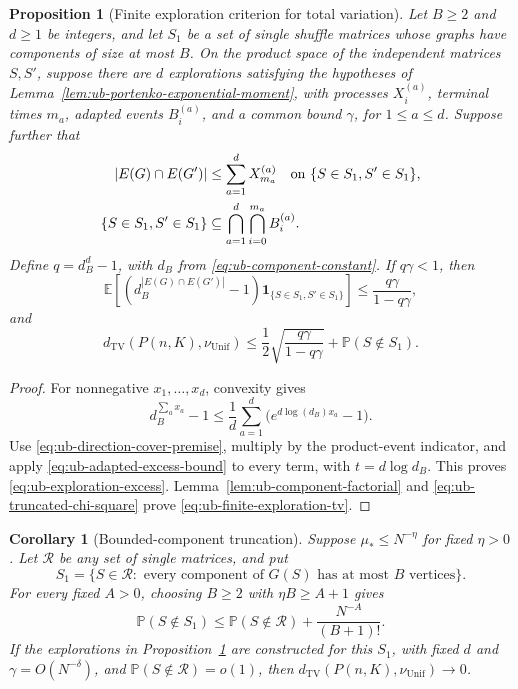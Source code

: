 \documentclass[11pt]{article}
\numberwithin{equation}{section}
\newtheorem{proposition}[proposition]{Proposition}
\newtheorem{corollary}[corollary]{Corollary}
\newcommand{\TV}{\mathrm{TV}}
\newcommand{\Unif}{\mathrm{Unif}}
\newcommand{\E}{\mathbb E}
\newcommand{\Pp}{\mathbb P}
\newcommand{\1}{\mathbf 1}
\newcommand{\dTV}{d_{\TV}}
\newcommand{\nuUnif}{\nu_{\Unif}}
\begin{document}
\begin{proposition}[Finite exploration criterion for total variation]
\label{lem:ub-shared-edge-exponential-moment}
Let $B\ge2$ and $d\ge1$ be integers, and let $S_1$ be a set of single
shuffle matrices whose graphs have components of size at most $B$.
On the product space of the independent matrices $S,S'$, suppose there
are $d$ explorations satisfying the hypotheses of
Lemma~\ref{lem:ub-portenko-exponential-moment}, with processes
$X^{(a)}_i$, terminal times $m_a$, adapted events $B^{(a)}_i$, and a
common bound $\gamma$, for $1\le a\le d$. Suppose further that
\begin{equation}
\label{eq:ub-direction-cover-premise}
 \begin{aligned}
 |E(G)\cap E(G')|&\le\sum_{a=1}^dX^{(a)}_{m_a}
 \quad\hbox{on }\{S\in S_1,S'\in S_1\},\\
 \{S\in S_1,S'\in S_1\}&\subseteq
                \bigcap_{a=1}^d\bigcap_{i=0}^{m_a}B^{(a)}_i.
 \end{aligned}
\end{equation}
Define $q=d_B^d-1$, with $d_B$ from
\eqref{eq:ub-component-constant}. If $q\gamma<1$, then
\begin{equation}
\label{eq:ub-exploration-excess}
 \E\left[(d_B^{|E(G)\cap E(G')|}-1)
       \1_{\{S\in S_1,S'\in S_1\}}\right]
 \le\frac{q\gamma}{1-q\gamma},
\end{equation}
and
\begin{equation}
\label{eq:ub-finite-exploration-tv}
 \dTV(P(n,K),\nuUnif)
 \le\frac12\sqrt{\frac{q\gamma}{1-q\gamma}}+\Pp(S\notin S_1).
\end{equation}
\end{proposition}

\begin{proof}
For nonnegative $x_1,\ldots,x_d$, convexity gives
\[
 d_B^{\sum_a x_a}-1
 \le\frac1d\sum_{a=1}^d\bigl(e^{d\log(d_B)x_a}-1\bigr).
\]
Use \eqref{eq:ub-direction-cover-premise}, multiply by the product-event
indicator, and apply \eqref{eq:ub-adapted-excess-bound} to every term,
with $t=d\log d_B$. This proves \eqref{eq:ub-exploration-excess}.
Lemma~\ref{lem:ub-component-factorial} and
\eqref{eq:ub-truncated-chi-square} prove
\eqref{eq:ub-finite-exploration-tv}.
\end{proof}

\begin{corollary}[Bounded-component truncation]
\label{lem:ub-regularity-sparsity}
Suppose $\mu_*\le N^{-\eta}$ for fixed $\eta>0$.
Let $\mathcal R$ be any set of single matrices, and put
\[
 S_1=\{S\in\mathcal R:\text{ every component of }G(S)
                            \text{ has at most }B\text{ vertices}\}.
\]
For every fixed $A>0$, choosing $B\ge2$ with $\eta B\ge A+1$ gives
\begin{equation}
\label{eq:ub-single-matrix-truncation}
 \Pp(S\notin S_1)\le\Pp(S\notin\mathcal R)
                         +\frac{N^{-A}}{(B+1)!}.
\end{equation}
If the explorations in
Proposition~\ref{lem:ub-shared-edge-exponential-moment} are constructed
for this $S_1$, with fixed $d$ and $\gamma=O(N^{-\delta})$, and
$\Pp(S\notin\mathcal R)=o(1)$, then
$\dTV(P(n,K),\nuUnif)\to0$.
\end{corollary}
\end{document}
